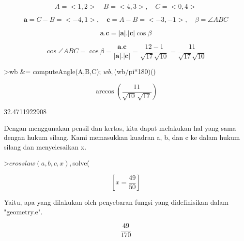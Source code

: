 \documentclass{article}
\begin{document}
\begin{eulernotebook}
\begin{eulercomment}
\begin{eulercomment}
\begin{eulercomment}
\end{eulercomment}
\begin{eulerformula}
\[
A=<1,2>\quad B=<4,3>,\quad C=<0,4>
\]
\end{eulerformula}
\begin{eulerformula}
\[
\mathbf{a}=C-B=<-4,1>,\quad \mathbf{c}=A-B=<-3,-1>,\quad \beta=\angle ABC
\]
\end{eulerformula}
\begin{eulerformula}
\[
\mathbf{a}.\mathbf{c}=|\mathbf{a}|.|\mathbf{c}|\cos \beta
\]
\end{eulerformula}
\begin{eulerformula}
\[
\cos \angle ABC =\cos\beta=\frac{\mathbf{a}.\mathbf{c}}{|\mathbf{a}|.|\mathbf{c}|}=\frac{12 -1}{\sqrt{17}\sqrt{10}}=\frac{11}{\sqrt{17}\sqrt{10}}
\]
\end{eulerformula}
\begin{eulerprompt}
>wb &= computeAngle(A,B,C); $wb, $(wb/pi*180)()
\end{eulerprompt}
\begin{eulerformula}
\[
\arccos \left(\frac{11}{\sqrt{10}\,\sqrt{17}}\right)
\]
\end{eulerformula}
\begin{euleroutput}
  32.4711922908
\end{euleroutput}
\begin{eulercomment}
Dengan menggunakan pensil dan kertas, kita dapat melakukan hal yang
sama dengan hukum silang. Kami memasukkan kuadran a, b, dan c ke dalam
hukum silang dan menyelesaikan x.
\end{eulercomment}
\begin{eulerprompt}
>$crosslaw(a,b,c,x), $solve(%
\end{eulerprompt}
\begin{eulerformula}
\[
\left[ x=\frac{49}{50} \right] 
\]
\end{eulerformula}
\begin{eulercomment}
Yaitu, apa yang dilakukan oleh penyebaran fungsi yang didefinisikan
dalam "geometry.e".
\end{eulercomment}
\begin{eulerformula}
\[
\frac{49}{170}
\]
\end{eulerformula}
\begin{eulercomment}

\end{eulercomment}
\end{eulercomment}
\end{eulercomment}
\end{eulernotebook}
\end{document}
